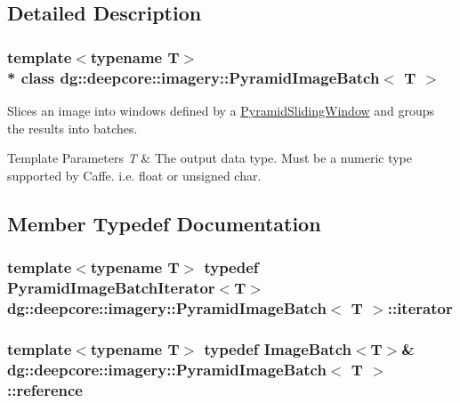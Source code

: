 \subsection{Detailed Description}
\subsubsection*{template$<$typename T$>$\\*
class dg\+::deepcore\+::imagery\+::\+Pyramid\+Image\+Batch$<$ T $>$}

Slices an image into windows defined by a \hyperlink{classdg_1_1deepcore_1_1imagery_1_1_pyramid_sliding_window}{Pyramid\+Sliding\+Window} and groups the results into batches. 


\begin{DoxyTemplParams}{Template Parameters}
{\em T} & The output data type. Must be a numeric type supported by Caffe. i.\+e. float or unsigned char. \\
\hline
\end{DoxyTemplParams}


\subsection{Member Typedef Documentation}
\subsubsection[{\texorpdfstring{iterator}{iterator}}]{\setlength{\rightskip}{0pt plus 5cm}template$<$typename T$>$ typedef {\bf Pyramid\+Image\+Batch\+Iterator}$<$T$>$ {\bf dg\+::deepcore\+::imagery\+::\+Pyramid\+Image\+Batch}$<$ T $>$\+::{\bf iterator}}\hypertarget{classdg_1_1deepcore_1_1imagery_1_1_pyramid_image_batch_a4cad1aac53a144da29324e48ea357f78}{}\label{classdg_1_1deepcore_1_1imagery_1_1_pyramid_image_batch_a4cad1aac53a144da29324e48ea357f78}
\subsubsection[{\texorpdfstring{reference}{reference}}]{\setlength{\rightskip}{0pt plus 5cm}template$<$typename T$>$ typedef {\bf Image\+Batch}$<$T$>$\& {\bf dg\+::deepcore\+::imagery\+::\+Pyramid\+Image\+Batch}$<$ T $>$\+::{\bf reference}}\hypertarget{classdg_1_1deepcore_1_1imagery_1_1_pyramid_image_batch_ac40a046993c4d0ccdc5a44659b130c68}{}\label{classdg_1_1deepcore_1_1imagery_1_1_pyramid_image_batch_ac40a046993c4d0ccdc5a44659b130c68}

